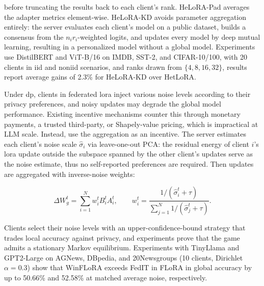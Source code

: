 \documentclass[12pt,a4paper]{article}
\begin{document}
before truncating the results back to each client's rank. HeLoRA-Pad averages the adapter metrics element-wise. HeLoRA-KD avoids parameter aggregation entirely: the server evaluates each client's model on a public dataset, builds a consensus from the $n_i r_i$-weighted logits, and updates every model by deep mutual learning, resulting in a personalized model without a global model. Experiments use DistilBERT and ViT-B/16 on IMDB, SST-2, and CIFAR-10/100, with 20 clients in \gls{iid} and \gls{noniid} scenarios, and ranks drawn from $\{4, 8, 16, 32\}$, results report average gains of 2.3\% for HeLoRA-KD over HetLoRA.

Under \gls{dp}, clients in federated \gls{lora} inject various noise levels according to their privacy preferences, and noisy updates may degrade the global model performance. Existing incentive mechanisms counter this through monetary payments, a trusted third-party, or Shapely-value pricing, which is impractical at LLM scale. Instead, \cite{kouWinFLoRAIncentivizingClientAdaptive2026} use the aggregation as an incentive. The server estimates each client's noise scale $\hat{\sigma}_i$ via leave-one-out PCA: the residual energy of client $i$'s \gls{lora} update outside the subspace spanned by the other client's updates serve as the noise estimate, thus no self-reported preferences are required. Then updates are aggregated with inverse-noise weights:

\begin{equation}
  \Delta W_g^t = \sum_{i=1}^{N} w_i^t B_i^t A_i^t, \qquad
  w_i^t = \frac{1/(\hat{\sigma}_i^t + \tau)}{\sum_{j=1}^{N} 1/(\hat{\sigma}_j^t + \tau)}.
  \label{eq:winflora_aggregation}
\end{equation}

Clients select their noise levels with an upper-confidence-bound strategy that trades local accuracy against privacy, and experiments prove that the game admits a stationary Markov equilibrium. Experiments with TinyLlama and GPT2-Large on AGNews, DBpedia, and 20Newsgroups (10 clients, Dirichlet $\alpha=0.3$) show that WinFLoRA exceeds FedIT in FLoRA in global accuracy by up to 50.66\% and 52.58\% at matched average noise, respectively.

\cite{guoselectiveaggregationlowrank25}
\end{document}
